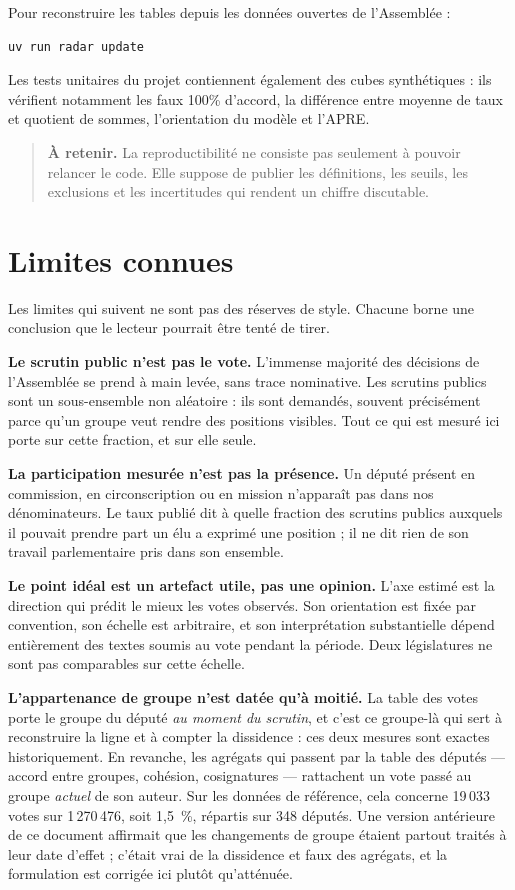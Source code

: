 \documentclass[11pt,a4paper]{article}
\newcommand{\important}[1]{\begin{quote}\small\color{blue!55!black}\textbf{À retenir.} #1\end{quote}}
\begin{document}
Pour reconstruire les tables depuis les données ouvertes de l'Assemblée :

\begin{verbatim}
uv run radar update
\end{verbatim}

Les tests unitaires du projet contiennent également des cubes synthétiques :
ils vérifient notamment les faux 100\% d'accord, la différence entre moyenne de
taux et quotient de sommes, l'orientation du modèle et l'APRE.

\important{La reproductibilité ne consiste pas seulement à pouvoir relancer le
code. Elle suppose de publier les définitions, les seuils, les exclusions et
les incertitudes qui rendent un chiffre discutable.}

\section{Limites connues}

Les limites qui suivent ne sont pas des réserves de style. Chacune borne une
conclusion que le lecteur pourrait être tenté de tirer.

\textbf{Le scrutin public n'est pas le vote.} L'immense majorité des décisions
de l'Assemblée se prend à main levée, sans trace nominative. Les scrutins
publics sont un sous-ensemble non aléatoire : ils sont demandés, souvent
précisément parce qu'un groupe veut rendre des positions visibles. Tout ce qui
est mesuré ici porte sur cette fraction, et sur elle seule.

\textbf{La participation mesurée n'est pas la présence.} Un député présent en
commission, en circonscription ou en mission n'apparaît pas dans nos
dénominateurs. Le taux publié dit à quelle fraction des scrutins publics
auxquels il pouvait prendre part un élu a exprimé une position ; il ne dit
rien de son travail parlementaire pris dans son ensemble.

\textbf{Le point idéal est un artefact utile, pas une opinion.} L'axe estimé
est la direction qui prédit le mieux les votes observés. Son orientation est
fixée par convention, son échelle est arbitraire, et son interprétation
substantielle dépend entièrement des textes soumis au vote pendant la période.
Deux législatures ne sont pas comparables sur cette échelle.

\textbf{L'appartenance de groupe n'est datée qu'à moitié.} La table des votes
porte le groupe du député \emph{au moment du scrutin}, et c'est ce groupe-là qui
sert à reconstruire la ligne et à compter la dissidence : ces deux mesures sont
exactes historiquement. En revanche, les agrégats qui passent par la table des
députés — accord entre groupes, cohésion, cosignatures — rattachent un vote
passé au groupe \emph{actuel} de son auteur. Sur les données de référence, cela
concerne 19\,033 votes sur 1\,270\,476, soit 1,5~\%, répartis sur 348 députés.
Une version antérieure de ce document affirmait que les changements de groupe
étaient partout traités à leur date d'effet ; c'était vrai de la dissidence et
faux des agrégats, et la formulation est corrigée ici plutôt qu'atténuée.
\end{document}
